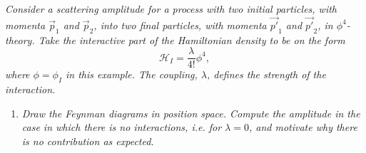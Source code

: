 \begin{example}
	\emph{Consider a scattering amplitude for a process with two initial particles, with momenta $\vec{p}_1$ and $\vec{p}_2$, into two final particles, with momenta $\vec{p'}_1$ and $\vec{p'}_2$, in $\phi^4$-theory. Take the interactive part of the Hamiltonian density to be on the form}
	\begin{equation}
		\mathcal{H}_I=\frac{\lambda}{4!}\phi^4,
	\end{equation} 
	\emph{where $\phi=\phi_I$ in this example. The coupling, $\lambda$, defines the strength of the interaction. }
	\begin{enumerate}
		\item \emph{Draw the Feynman diagrams in position space. Compute the amplitude in the case in which there is no interactions, i.e. for $\lambda=0$, and motivate why there is no contribution as expected.}
		

\end{enumerate}
\end{example}
